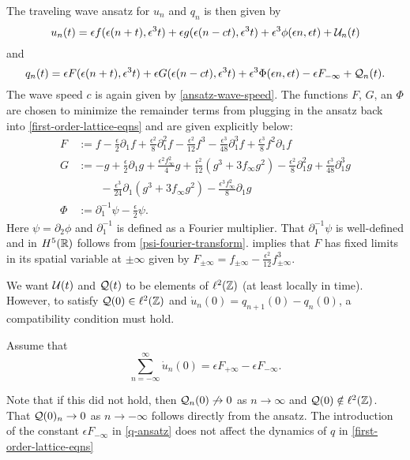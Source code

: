 The traveling wave ansatz for \(u_n\) and \(q_n\) is then given by
\begin{equation}\label{u-ansatz}
	u_n(t) = \epsilon f(\epsilon(n+t), \epsilon^3t) + \epsilon g(\epsilon(n-ct), \epsilon^3 t) + \epsilon^3 \phi(\epsilon n , \epsilon t) + \mathcal{U}_n(t)
\end{equation}
and 
\begin{equation}\label{q-ansatz}
	q_n(t) = \epsilon F(\epsilon(n+t), \epsilon^3 t) + \epsilon G(\epsilon(n-ct), \epsilon^3 t) + \epsilon^3 \Phi(\epsilon n, \epsilon t) - \epsilon F_{-\infty} + \mathcal{Q}_n(t).
\end{equation}
The wave speed \(c\) is again given by \cref{ansatz-wave-speed}. The functions \(F\), \(G\), an \(\Phi\) are chosen to minimize the remainder terms from plugging in the ansatz back into \cref{first-order-lattice-eqns} and are given explicitly below:
\begin{align}
	F &:= f - \frac{\epsilon} 2 \partial_1 f + \frac{\epsilon^2} 8 \partial_1^2 f - \frac{\epsilon^2}{12} f^3  - \frac{\epsilon^3}{48} \partial_1^3 f + \frac{\epsilon^3} 8 f^2 \partial_1 f\\
	G &:= - g + \frac{\epsilon}{2}\partial_1 g + \frac{\epsilon^2 f_\infty^2} 4  g + \frac{\epsilon^2}{12}(g^3 + 3f_\infty g^2) -\frac{ \epsilon^2} 8 \partial_1^2 g  + \frac{\epsilon^3}{48} \partial_1^3 g \\
	&\qquad - \frac{\epsilon^3}{24} \partial_1(g^3 + 3f_\infty g^2) - \frac{\epsilon^3 f_\infty^2} 8 \partial_1 g \nonumber \\
	\Phi &:=  \partial_1^{-1}\psi - \frac{\epsilon} 2 \psi.
\end{align}
Here \(\psi = \partial_2 \phi\) and \(\partial_1^{-1}\) is defined as a Fourier multiplier. That \(\partial_1^{-1}\psi\) is well-defined and in \(H^5(\mathbb{R})\) follows from \cref{psi-fourier-transform}.  implies that \(F\) has fixed limits in its spatial variable at \(\pm \infty\) given by \(F_{\pm\infty} = f_{\pm\infty} -\frac{\epsilon^2}{12} f^3_{\pm\infty}\).

We want \(\mathcal{U}(t)\) and \(\mathcal{Q}(t)\) to be elements of \(\ell^2(\mathbb{Z})\) (at least locally in time). However, to satisfy \(\mathcal{Q}(0)\in\ell^2(\mathbb{Z})\) and \(\dot u_n(0) = q_{n+1}(0) - q_n(0)\), a compatibility condition must hold.
\begin{assum}\label{assumption-2}
	Assume that \[\sum_{n=-\infty}^\infty \dot u_n(0) = \epsilon F_{+\infty} - \epsilon F_{-\infty}.\]
\end{assum}
Note that if this did not hold, then \(\mathcal{Q}_n(0)\not\to 0\) as \(n\to\infty\) and \(\mathcal{Q}(0)\notin \ell^2(\mathbb{Z})\). That \(\mathcal{Q}(0)_n \to 0\) as \(n\to-\infty\) follows directly from the ansatz. The introduction of the constant \(\epsilon F_{-\infty}\) in \cref{q-ansatz} does not affect the dynamics of \(q\) in \cref{first-order-lattice-eqns}

